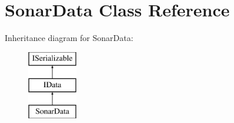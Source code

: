 \hypertarget{class_sonar_data}{}\section{Sonar\+Data Class Reference}
\label{class_sonar_data}
Inheritance diagram for Sonar\+Data\+:\begin{figure}[H]
\begin{center}
\leavevmode
\includegraphics[height=3.000000cm]{class_sonar_data}
\end{center}
\end{figure}
